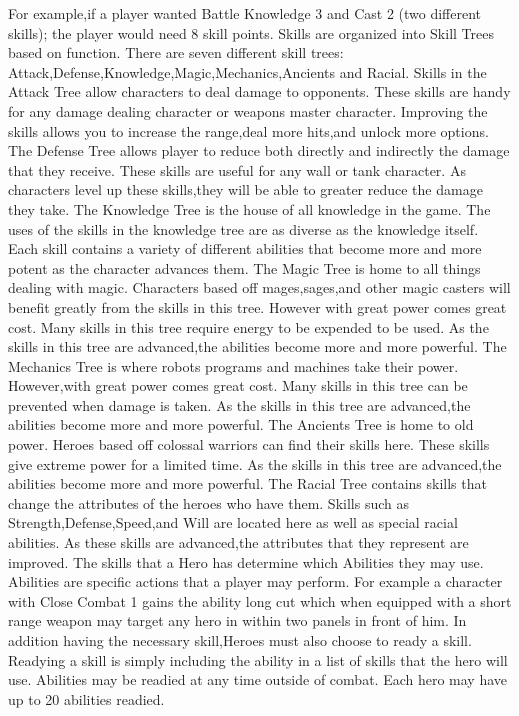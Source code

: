 For example,if a player wanted Battle Knowledge 3 and Cast 2 (two different
skills); the player would need 8 skill points.  Skills are organized into Skill
Trees based on function.  There are seven different skill trees:
Attack,Defense,Knowledge,Magic,Mechanics,Ancients and Racial.  Skills in the
Attack Tree allow characters to deal damage to opponents.  These skills are
handy for any damage dealing character or weapons master character.  Improving
the skills allows you to increase the range,deal more hits,and unlock more
options.  The Defense Tree allows player to reduce both directly and indirectly
the damage that they receive.  These skills are useful for any wall or tank
character.  As characters level up these skills,they will be able to greater
reduce the damage they take.  The Knowledge Tree is the house of all knowledge
in the game.  The uses of the skills in the knowledge tree are as diverse as
the knowledge itself.  Each skill contains a variety of different abilities
that become more and more potent as the character advances them.  The Magic
Tree is home to all things dealing with magic.  Characters based off
mages,sages,and other magic casters will benefit greatly from the skills in
this tree.  However with great power comes great cost.  Many skills in this
tree require energy to be expended to be used.  As the skills in this tree are
advanced,the abilities become more and more powerful.  The Mechanics Tree is
where robots programs and machines take their power.  However,with great power
comes great cost.  Many skills in this tree can be prevented when damage is
taken.  As the skills in this tree are advanced,the abilities become more and
more powerful.  The Ancients Tree is home to old power.  Heroes based off
colossal warriors can find their skills here.  These skills give extreme power
for a limited time.  As the skills in this tree are advanced,the abilities
become more and more powerful.  The Racial Tree contains skills that change the
attributes of the heroes who have them.  Skills such as
Strength,Defense,Speed,and Will are located here as well as special racial
abilities.  As these skills are advanced,the attributes that they represent are
improved.  The skills that a Hero has determine which Abilities they may use.
Abilities are specific actions that a player may perform.  For example a
character with Close Combat 1 gains the ability long cut which when equipped
with a short range weapon may target any hero in within two panels in front of
him.  In addition having the necessary skill,Heroes must also choose to ready a
skill.  Readying a skill is simply including the ability in a list of skills
that the hero will use.  Abilities may be readied at any time outside of
combat.  Each hero may have up to 20 abilities readied.

